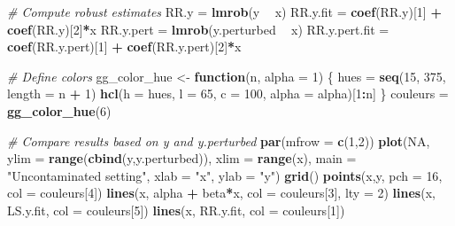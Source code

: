 \documentclass[]{book}
\newenvironment{Shaded}{\begin{snugshade}}{\end{snugshade}}
\newcommand{\CommentTok}[1]{\textcolor[rgb]{0.56,0.35,0.01}{\textit{#1}}}
\newcommand{\ControlFlowTok}[1]{\textcolor[rgb]{0.13,0.29,0.53}{\textbf{#1}}}
\newcommand{\DataTypeTok}[1]{\textcolor[rgb]{0.13,0.29,0.53}{#1}}
\newcommand{\DecValTok}[1]{\textcolor[rgb]{0.00,0.00,0.81}{#1}}
\newcommand{\KeywordTok}[1]{\textcolor[rgb]{0.13,0.29,0.53}{\textbf{#1}}}
\newcommand{\NormalTok}[1]{#1}
\newcommand{\OperatorTok}[1]{\textcolor[rgb]{0.81,0.36,0.00}{\textbf{#1}}}
\newcommand{\OtherTok}[1]{\textcolor[rgb]{0.56,0.35,0.01}{#1}}
\newcommand{\StringTok}[1]{\textcolor[rgb]{0.31,0.60,0.02}{#1}}
\theoremstyle{definition}
\theoremstyle{definition}
\theoremstyle{definition}
\theoremstyle{remark}
\begin{document}
{\begin{Shaded}
\begin{Highlighting}[]
\CommentTok{# Compute robust estimates}
\NormalTok{RR.y =}\StringTok{ }\KeywordTok{lmrob}\NormalTok{(y }\OperatorTok{~}\StringTok{ }\NormalTok{x)}
\NormalTok{RR.y.fit =}\StringTok{ }\KeywordTok{coef}\NormalTok{(RR.y)[}\DecValTok{1}\NormalTok{] }\OperatorTok{+}\StringTok{ }\KeywordTok{coef}\NormalTok{(RR.y)[}\DecValTok{2}\NormalTok{]}\OperatorTok{*}\NormalTok{x}
\NormalTok{RR.y.pert =}\StringTok{ }\KeywordTok{lmrob}\NormalTok{(y.perturbed }\OperatorTok{~}\StringTok{ }\NormalTok{x)}
\NormalTok{RR.y.pert.fit =}\StringTok{ }\KeywordTok{coef}\NormalTok{(RR.y.pert)[}\DecValTok{1}\NormalTok{] }\OperatorTok{+}\StringTok{ }\KeywordTok{coef}\NormalTok{(RR.y.pert)[}\DecValTok{2}\NormalTok{]}\OperatorTok{*}\NormalTok{x}

\CommentTok{# Define colors}
\NormalTok{gg_color_hue <-}\StringTok{ }\ControlFlowTok{function}\NormalTok{(n, }\DataTypeTok{alpha =} \DecValTok{1}\NormalTok{) \{}
\NormalTok{  hues =}\StringTok{ }\KeywordTok{seq}\NormalTok{(}\DecValTok{15}\NormalTok{, }\DecValTok{375}\NormalTok{, }\DataTypeTok{length =}\NormalTok{ n }\OperatorTok{+}\StringTok{ }\DecValTok{1}\NormalTok{)}
  \KeywordTok{hcl}\NormalTok{(}\DataTypeTok{h =}\NormalTok{ hues, }\DataTypeTok{l =} \DecValTok{65}\NormalTok{, }\DataTypeTok{c =} \DecValTok{100}\NormalTok{, }\DataTypeTok{alpha =}\NormalTok{ alpha)[}\DecValTok{1}\OperatorTok{:}\NormalTok{n]}
\NormalTok{\}}
\NormalTok{couleurs =}\StringTok{ }\KeywordTok{gg_color_hue}\NormalTok{(}\DecValTok{6}\NormalTok{)}

\CommentTok{# Compare results based on y and y.perturbed}
\KeywordTok{par}\NormalTok{(}\DataTypeTok{mfrow =} \KeywordTok{c}\NormalTok{(}\DecValTok{1}\NormalTok{,}\DecValTok{2}\NormalTok{))}
\KeywordTok{plot}\NormalTok{(}\OtherTok{NA}\NormalTok{, }\DataTypeTok{ylim =} \KeywordTok{range}\NormalTok{(}\KeywordTok{cbind}\NormalTok{(y,y.perturbed)), }\DataTypeTok{xlim =} \KeywordTok{range}\NormalTok{(x),}
     \DataTypeTok{main =} \StringTok{"Uncontaminated setting"}\NormalTok{, }\DataTypeTok{xlab =} \StringTok{"x"}\NormalTok{, }\DataTypeTok{ylab =} \StringTok{"y"}\NormalTok{)}
\KeywordTok{grid}\NormalTok{()}
\KeywordTok{points}\NormalTok{(x,y, }\DataTypeTok{pch =} \DecValTok{16}\NormalTok{, }\DataTypeTok{col =}\NormalTok{ couleurs[}\DecValTok{4}\NormalTok{])}
\KeywordTok{lines}\NormalTok{(x, alpha }\OperatorTok{+}\StringTok{ }\NormalTok{beta}\OperatorTok{*}\NormalTok{x, }\DataTypeTok{col =}\NormalTok{ couleurs[}\DecValTok{3}\NormalTok{], }\DataTypeTok{lty =} \DecValTok{2}\NormalTok{)}
\KeywordTok{lines}\NormalTok{(x, LS.y.fit, }\DataTypeTok{col =}\NormalTok{ couleurs[}\DecValTok{5}\NormalTok{])}
\KeywordTok{lines}\NormalTok{(x, RR.y.fit, }\DataTypeTok{col =}\NormalTok{ couleurs[}\DecValTok{1}\NormalTok{])}


\end{Highlighting}
\end{Shaded}}
\end{document}

